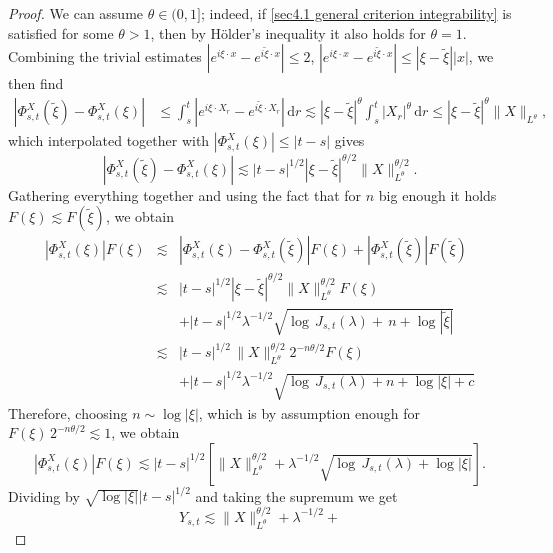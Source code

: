 \documentclass[10pt]{article}
\newcommand{\mathd}{\mathrm{d}}
\begin{document}
\begin{proof}
%  
  We can assume $\theta\in (0,1]$; indeed, if \eqref{sec4.1 general criterion integrability} is satisfied for some $\theta>1$, then by H\"older's inequality it also holds for $\theta=1$.
  Combining the trivial estimates $| e^{i \xi \cdot x} -
  e^{i \tilde{\xi} \cdot x} | \leqslant 2$, $| e^{i \xi \cdot x} - e^{i
  \tilde{\xi} \cdot x} | \leqslant | \xi - \tilde{\xi} | | x |$, we then find
%  
  \begin{align}
    | \Phi_{s, t}^X (\tilde{\xi}) - \Phi_{s, t}^X (\xi) | & \leqslant \int_s^t
    | e^{i \xi \cdot X_r} - e^{i \tilde{\xi} \cdot X_r} | \, \mathd r \lesssim
    | \xi - \tilde{\xi} |^{\theta} \int_s^t | X_r |^{\theta} \, \mathd r
    \leqslant | \xi - \tilde{\xi} |^{\theta} \| X \|_{L^{\theta}}, \nonumber
  \end{align}
%  
  which interpolated together with $| \Phi^X_{s, t} (\xi) | \leqslant | t - s
  |$ gives
  \[ | \Phi_{s, t}^X (\tilde{\xi}) - \Phi_{s, t}^X (\xi) | \lesssim | t - s
     |^{1 / 2} | \xi - \tilde{\xi} |^{\theta / 2} \| X \|^{\theta /
     2}_{L^{\theta}} . \]
  Gathering everything together and using the fact that for $n$ big enough it
  holds $F (\xi) \lesssim F (\tilde{\xi})$, we obtain
  \begin{eqnarray*}
    | \Phi^X_{s, t} (\xi) | F (\xi) & \lesssim & | \Phi^X_{s, t} (\xi) -
    \Phi_{s, t}^X (\tilde{\xi}) | F (\xi) + | \Phi_{s, t}^X (\tilde{\xi}) | F
    (\tilde{\xi})\\
    & \lesssim & | t - s |^{1 / 2}  | \xi - \tilde{\xi} |^{\theta / 2}  \| X
    \|^{\theta / 2}_{L^{\theta}} F (\xi)\\
    &  & + | t - s |^{1 / 2} \lambda^{- 1 / 2}  \sqrt{\log \, J_{s, t}
    (\lambda) + \, n + \log | \tilde{\xi} |}\\
    & \lesssim & | t - s |^{1 / 2}  \, \| X \|^{\theta / 2}_{L^{\theta}} 2^{-
    n \theta / 2} F (\xi)\\
    &  & + | t - s |^{1 / 2} \lambda^{- 1 / 2}  \sqrt{\log \, J_{s, t}
    (\lambda) + n + \log | \xi | + c}
  \end{eqnarray*}
  Therefore, choosing $n \sim \log | \xi |$, which is by assumption enough for
  $F (\xi)  \, 2^{- n \theta / 2} \lesssim 1$, we obtain
  \[ | \Phi^X_{s, t} (\xi) | F (\xi) \lesssim | t - s |^{1 / 2} \left[ \| X
     \|^{\theta / 2}_{L^{\theta}} + \lambda^{- 1 / 2} \sqrt{\log \, J_{s, t}
     (\lambda) + \log | \xi |} \right] . \]
  Dividing by $\sqrt{\log | \xi |}  | t - s |^{1 / 2}$ and taking the supremum
  we get
  \[ Y_{s, t} \lesssim \| X \|^{\theta / 2}_{L^{\theta}} + \lambda^{- 1 / 2} +
\]
\end{proof}
\end{document}
